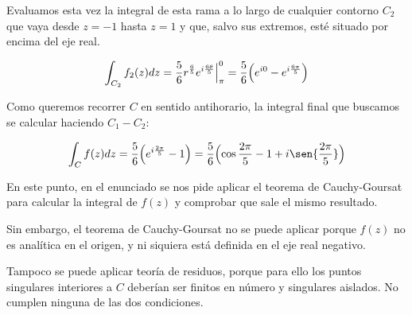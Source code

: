 \begin{enumerate}
    Evaluamos esta vez la integral de esta rama a lo largo de cualquier contorno $C_2$ que vaya desde $z = -1$ hasta $z = 1$ y que,
    salvo sus extremos, esté situado por encima del eje real.

    \begin{equation*}
        \int_{C_2} f_2(z) dz = \frac{5}{6} r^{\frac{6}{5}} e^{i\frac{6\theta}{5}} \Big|_\pi^{0} =
        \frac{5}{6}\Bigl(e^{i0} - e^{i\frac{6\pi}{5}} \Bigr)
    \end{equation*}

    Como queremos recorrer $C$ en sentido antihorario, la integral final que buscamos se calcular haciendo $C_1 - C_2$:

    \begin{equation*}
        \int_{C} f(z) dz = \frac{5}{6} \Bigl( e^{i\frac{2\pi}{5}} -1 \Bigr) =
        \frac{5}{6} \Bigl(  \cos{\frac{2\pi}{5}} - 1 + i \sen{\frac{2\pi}{5}} \Bigr)
    \end{equation*}


    \vspace{20px}
    En este punto, en el enunciado se nos pide aplicar el teorema de Cauchy-Goursat para calcular la integral de $f(z)$
    y comprobar que sale el mismo resultado.

    Sin embargo, el teorema de Cauchy-Goursat no se puede aplicar porque $f(z)$ no es analítica en el origen, y ni siquiera está
    definida en el eje real negativo.

    Tampoco se puede aplicar teoría de residuos, porque para ello los puntos singulares interiores a $C$ deberían
    ser finitos en número y singulares aislados. No cumplen ninguna de las dos condiciones.


\end{enumerate}